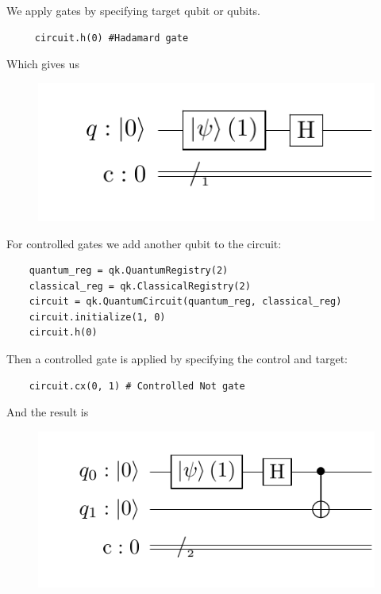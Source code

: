 We apply gates by specifying target qubit or qubits.

\begin{verbatim}
     circuit.h(0) #Hadamard gate
\end{verbatim}

Which gives us

\begin{figure}[H]
    \centering
    \includegraphics{Figures/Circuits/implementation/hada1.pdf}
\end{figure}

For controlled gates we add another qubit to the circuit:

\begin{verbatim}
    quantum_reg = qk.QuantumRegistry(2)
    classical_reg = qk.ClassicalRegistry(2)
    circuit = qk.QuantumCircuit(quantum_reg, classical_reg)
    circuit.initialize(1, 0)
    circuit.h(0)
\end{verbatim}

Then a controlled gate is applied by specifying the control and target:

\begin{verbatim}
    circuit.cx(0, 1) # Controlled Not gate
\end{verbatim}

And the result is

\begin{figure}[H]
    \centering
    \includegraphics{Figures/Circuits/implementation/cx2.pdf}
\end{figure}


